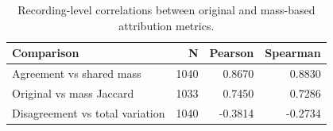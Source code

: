 \begin{table}[t]
\caption{Recording-level correlations between original and mass-based attribution metrics.}
\label{tab:06_formulation_comparison}
\begin{tabular}{lrrr}
\toprule
Comparison & N & Pearson & Spearman \\
\midrule
Agreement vs shared mass & 1040 & 0.8670 & 0.8830 \\
Original vs mass Jaccard & 1033 & 0.7450 & 0.7286 \\
Disagreement vs total variation & 1040 & -0.3814 & -0.2734 \\
\bottomrule
\end{tabular}
\end{table}
